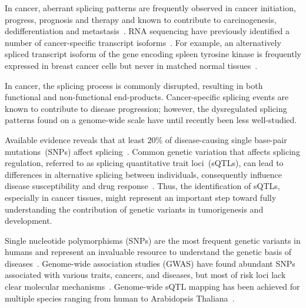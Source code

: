 \documentclass[11pt]{article}
\begin{document}
In cancer, aberrant splicing patterns are frequently observed in cancer initiation,
progress, prognosis and therapy and known to contribute to carcinogenesis, dedifferentiation and
metastasis~\cite{sveen2015, wang2018}. RNA sequencing have previously
identified a number of cancer-specific transcript isoforms~\cite{hoyos2019}. For example, an alternatively spliced
transcript isoform of the gene encoding spleen tyrosine kinase is frequently
expressed in breast cancer cells but never in matched normal
tissues~\cite{wang2003}.

In cancer, the splicing process is commonly disrupted, resulting in both functional and non-functional end-products. Cancer-specific splicing events are known to contribute to disease progression; however, the dysregulated splicing patterns found on a genome-wide scale have until recently been less well-studied. 

Available evidence reveals that at least $20\%$ of disease-causing single base-pair mutations~(SNPs) affect
splicing~\cite{faustino2003}. Common genetic variation that affects splicing
regulation, referred to as splicing quantitative trait loci~(sQTLs),
can lead to differences in alternative splicing between individuals,
consequently influence disease susceptibility and drug response~\cite{lalonde2011}. Thus, the identification of sQTLs, especially in cancer tissues, might represent an important step toward fully understanding the contribution of genetic variants in tumorigenesis and development.



Single nucleotide polymorphisms (SNPs) are the most frequent genetic variants in humans and represent an invaluable resource to understand
the genetic basis of diseases~\cite{shastry2009}. Genome-wide association studies (GWAS) have found abundant SNPs associated with
various traits, cancers, and diseases, but most of risk loci lack
clear molecular mechanisms~\cite{chang2018}. Genome-wide sQTL mapping
has been achieved for multiple species ranging from human to Arabidopsis Thaliana~\cite{khokhar2019}.
\end{document}

